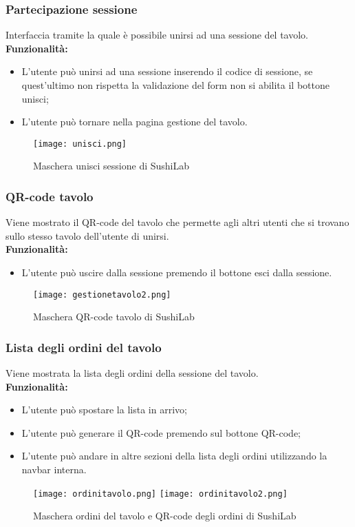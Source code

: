 \subsubsection{Partecipazione sessione}
Interfaccia tramite la quale è possibile unirsi ad una sessione del tavolo.\\
\textbf{Funzionalità:}
\begin{itemize}
    \item L'utente può unirsi ad una sessione inserendo il codice di sessione, se quest'ultimo non rispetta la validazione del form non si abilita il bottone unisci;
    \item L'utente può tornare nella pagina gestione del tavolo.
\end{itemize}
\begin{figure}[H]
    \centering
    \texttt{[image: unisci.png]}
    \caption{Maschera unisci sessione di SushiLab}
\end{figure}


\subsubsection{QR-code tavolo}
Viene mostrato il QR-code del tavolo che permette agli altri utenti che si trovano sullo stesso tavolo dell'utente di unirsi.\\
\textbf{Funzionalità:}
\begin{itemize}
    \item L'utente può uscire dalla sessione premendo il bottone esci dalla sessione.
\end{itemize}
\begin{figure}[H]
    \centering
    \texttt{[image: gestionetavolo2.png]}
    \caption{Maschera QR-code tavolo di SushiLab}
\end{figure}


\subsubsection{Lista degli ordini del tavolo}
Viene mostrata la lista degli ordini della sessione del tavolo.\\
\textbf{Funzionalità:}
\begin{itemize}
    \item L'utente può spostare la lista in arrivo;
    \item L'utente può generare il QR-code premendo sul bottone QR-code;
    \item L'utente può andare in altre sezioni della lista degli ordini utilizzando la navbar interna.
\end{itemize}
\begin{figure}[H]
    \centering
    \texttt{[image: ordinitavolo.png]}
    \texttt{[image: ordinitavolo2.png]}
    \caption{Maschera ordini del tavolo e QR-code degli ordini di SushiLab}
\end{figure}


